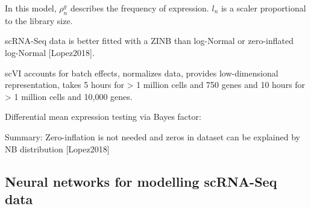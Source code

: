 
In this model, $\rho_n^g$ describes the frequency of expression. $l_n$ is a scaler proportional to the library size. 

scRNA-Seq data is better fitted with a ZINB than log-Normal or zero-inflated log-Normal [Lopez2018]. 

scVI accounts for batch effects, normalizes data, provides low-dimensional representation, takes 5 hours for > 1 million cells and 750 genes and 10 hours for > 1 million cells and 10,000 genes.

Differential mean expression testing via Bayes factor:



Summary: Zero-inflation is not needed and zeros in dataset can be explained by NB distribution [Lopez2018]


\subsection{Neural networks for modelling scRNA-Seq data}
 

